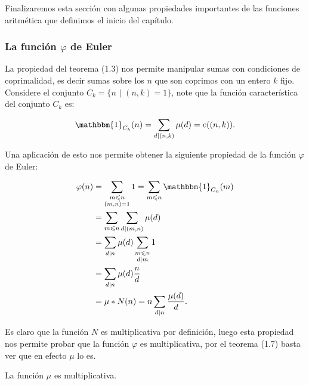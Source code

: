 Finalizaremos esta sección con algunas propiedades importantes de las funciones aritmética que definimos el inicio del capítulo.

\vspace*{-0.5cm}

\subsubsection{La función \texorpdfstring{$\varphi$}{Lg} de Euler}

La propiedad del teorema (1.3) nos permite manipular sumas  con condiciones de coprimalidad, es decir sumas sobre los $n$ que son coprimos con un entero $k$ fijo. Considere el conjunto $C_k=\{n \text{ | } (n,k)=1\}$, note que la función característica del conjunto $C_k$ es:

$$
\mathbbm{1}_{C_k}(n)=\sum_{d \mid(n, k)} \mu(d)=e((n,k)).
$$

Una aplicación de esto nos permite obtener la siguiente propiedad de la función $\varphi$ de Euler:

$$\begin{aligned}
\varphi(n) & =\sum_{\substack{m \leq n \\
(m, n)=1}} 1=\sum_{m\leq n}\mathbbm{1}_{C_n}(m) \\
& =\sum_{m \leq n} \sum_{d \mid(m, n)} \mu(d) \\
& =\sum_{d \mid n} \mu(d) \sum_{\substack{m \leq n \\
d \mid m}} 1 \\
& =\sum_{d \mid n} \mu(d) \frac{n}{d}\\
&=\mu*N(n)=n \sum_{d \mid n} \frac{\mu(d)}{d} .
\end{aligned}$$

Es claro que la función $N$ es multiplicativa por definición, luego esta propiedad nos permite probar que la función $\varphi$ es multiplicativa, por el teorema (1.7) basta ver que en efecto $\mu$ lo es.



\begin{theorem}
La función $\mu$ es multiplicativa.
\end{theorem}

